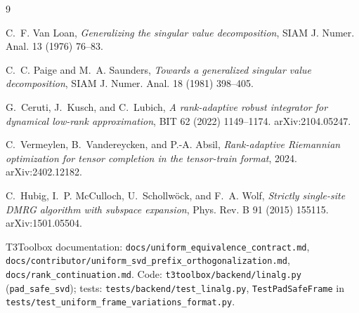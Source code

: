 \documentclass[11pt]{article}
\theoremstyle{definition}
\theoremstyle{remark}
\newcommand{\code}[1]{\texttt{#1}}
\begin{document}
\begin{thebibliography}{9}\small

 C.~F. Van Loan, \emph{Generalizing the singular value decomposition},
SIAM J. Numer. Anal. 13 (1976) 76--83.

 C.~C. Paige and M.~A. Saunders, \emph{Towards a generalized singular
value decomposition}, SIAM J. Numer. Anal. 18 (1981) 398--405.

 G.~Ceruti, J.~Kusch, and C.~Lubich, \emph{A rank-adaptive robust
integrator for dynamical low-rank approximation}, BIT 62 (2022) 1149--1174. arXiv:2104.05247.

 C.~Vermeylen, B.~Vandereycken, and P.-A. Absil,
\emph{Rank-adaptive Riemannian optimization for tensor completion in the tensor-train format},
2024. arXiv:2402.12182.

 C.~Hubig, I.~P. McCulloch, U.~Schollw\"ock, and F.~A. Wolf, \emph{Strictly
single-site DMRG algorithm with subspace expansion}, Phys. Rev. B 91 (2015) 155115.
arXiv:1501.05504.

 T3Toolbox documentation: \code{docs/uniform\_equivalence\_contract.md},
\code{docs/contributor/uniform\_svd\_prefix\_orthogonalization.md},
\code{docs/rank\_continuation.md}. Code: \code{t3toolbox/backend/linalg.py}
(\code{pad\_safe\_svd}); tests: \code{tests/backend/test\_linalg.py},
\code{TestPadSafeFrame} in \code{tests/test\_uniform\_frame\_variations\_format.py}.

\end{thebibliography}
\end{document}
